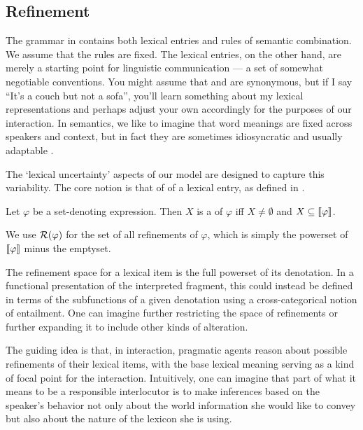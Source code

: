 \documentclass[leqno]{article}
\begin{document}

\subsection{Refinement}\label{sec:refine}

The grammar in  contains both lexical entries and
rules of semantic combination. We assume that the rules are fixed.
The lexical entries, on the other hand, are merely a starting point
for linguistic communication --- a set of somewhat negotiable
conventions. You might assume that  and  are
synonymous, but if I say ``It's a couch but not a sofa'', you'll learn
something about my lexical representations and perhaps adjust your own
accordingly for the purposes of our interaction. In semantics, we like
to imagine that word meanings are fixed across speakers and context,
but in fact they are sometimes idiosyncratic and usually adaptable
\citep{Clark97}.

The `lexical uncertainty' aspects of our model are designed to capture
this variability. The core notion is that of  of a
lexical entry, as defined in .
%
\begin{examples}
\item\label{refinement} 
  \begin{examples}
  \item Let $\varphi$ be a set-denoting expression. Then $X$ is a
     of $\varphi$ iff $X \neq \emptyset$ and $X
    \subseteq \llbracket\varphi\rrbracket$.

  \item We use $\mathcal{R}(\varphi)$ for the set of all refinements of
    $\varphi$, which is simply the powerset of $\llbracket\varphi\rrbracket$ minus
    the emptyset.
  \end{examples}
\end{examples}
%
The refinement space for a lexical item is the full powerset of its
denotation. In a functional presentation of the interpreted fragment,
this could instead be defined in terms of the subfunctions of a given
denotation using a cross-categorical notion of entailment. One can
imagine further restricting the space of refinements or further
expanding it to include other kinds of alteration.

The guiding idea is that, in interaction, pragmatic agents reason
about possible refinements of their lexical items, with the base
lexical meaning serving as a kind of focal point for the interaction.
Intuitively, one can imagine that part of what it means to be a
responsible interlocutor is to make inferences based on the speaker's
behavior not only about the world information she would like to convey
but also about the nature of the lexicon she is using.
\end{document}
